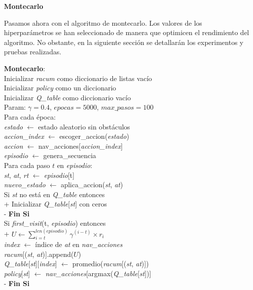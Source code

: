 \documentclass[conference,a4paper]{IEEEtran}
\begin{document}
\textbf{Montecarlo \newline}

Pasamos ahora con el algoritmo de montecarlo. Los valores de los hiperparámetros se han seleccionado de manera que optimicen el rendimiento del algoritmo. 
No obstante, en la siguiente sección se detallarán los experimentos y pruebas realizadas.\newline

  \begin{pseudo}[compact]
    \textbf{Montecarlo}: \\
    Inicializar \textit{racum} como diccionario de listas vacío \\
    Inicializar \textit{policy} como un diccionario\\ 
    Inicializar \textit{Q\_table} como diccionario vacío \\
    Param: $\gamma = 0.4$, $epocas = 5000$, $max\_pasos = 100$ \\
    Para cada época: \\
    \> \textit{estado} $\leftarrow$ estado aleatorio sin obstáculos \\
    \> \textit{accion\_index} $\leftarrow$ escoger\_accion(\textit{estado}) \\
    \> \textit{accion} $\leftarrow$ nav\_acciones[\textit{accion\_index}] \\
    \> \textit{episodio} $\leftarrow$ genera\_secuencia\\
    \> Para cada paso $t$ en \textit{episodio}: \\
    \> \> \textit{st}, \textit{at}, \textit{rt} $\leftarrow$ \textit{episodio}[t] \\
    \> \> \textit{nuevo\_estado} $\leftarrow$ aplica\_accion(\textit{st}, \textit{at}) \\
    \> \> Si \textit{st} no está en \textit{Q\_table} entonces \\+
      Inicializar \textit{Q\_table}[\textit{st}] con ceros \\-
    \> \> \textbf{Fin Si} \\
    \> \> Si \textit{first\_visit}(t, \textit{episodio}) entonces \\+
      $U \leftarrow \sum_{i=t}^{len(episodio)} \gamma^{(i-t)} \times r_i$ \\
      \textit{index} $\leftarrow$ índice de \textit{at} en \textit{nav\_acciones} \\
      \textit{racum}[(\textit{st}, \textit{at})].append($U$) \\
      \textit{Q\_table}[\textit{st}][\textit{index}] $\leftarrow$ promedio(\textit{racum}[(\textit{st}, \textit{at})]) \\
      \textit{policy}[\textit{st}] $\leftarrow$ \textit{nav\_acciones}[argmax(\textit{Q\_table}[\textit{st}])] \\-
    \> \> \textbf{Fin Si} \\
    \\
  \end{pseudo}
  
\end{document}
